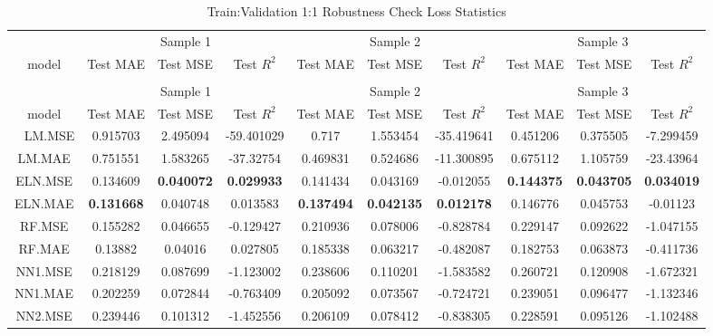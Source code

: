 \begingroup\fontsize{6}{8}\selectfont

\begin{longtable}[t]{cccccccccc}
\caption{\label{tab:}Train:Validation 1:1 Robustness Check Loss Statistics}\\
\toprule
\multicolumn{1}{c}{ } & \multicolumn{3}{c}{Sample 1} & \multicolumn{3}{c}{Sample 2} & \multicolumn{3}{c}{Sample 3} \\
\cmidrule(l{3pt}r{3pt}){2-4} \cmidrule(l{3pt}r{3pt}){5-7} \cmidrule(l{3pt}r{3pt}){8-10}
model & Test MAE & Test MSE & Test $R^2$ & Test MAE & Test MSE & Test $R^2$ & Test MAE & Test MSE & Test $R^2$\\
\midrule
\endfirsthead
\caption[]{Train:Validation 1:1 Robustness Check Loss Statistics }\\
\toprule
\multicolumn{1}{c}{ } & \multicolumn{3}{c}{Sample 1} & \multicolumn{3}{c}{Sample 2} & \multicolumn{3}{c}{Sample 3} \\
\cmidrule(l{3pt}r{3pt}){2-4} \cmidrule(l{3pt}r{3pt}){5-7} \cmidrule(l{3pt}r{3pt}){8-10}
model & Test MAE & Test MSE & Test $R^2$ & Test MAE & Test MSE & Test $R^2$ & Test MAE & Test MSE & Test $R^2$\\
\midrule
\endhead
\
\endfoot
\bottomrule
\endlastfoot
LM.MSE & 0.915703 & 2.495094 & -59.401029 & 0.717 & 1.553454 & -35.419641 & 0.451206 & 0.375505 & -7.299459\\
LM.MAE & 0.751551 & 1.583265 & -37.32754 & 0.469831 & 0.524686 & -11.300895 & 0.675112 & 1.105759 & -23.43964\\
ELN.MSE & 0.134609 & \textbf{0.040072} & \textbf{0.029933} & 0.141434 & 0.043169 & -0.012055 & \textbf{0.144375} & \textbf{0.043705} & \textbf{0.034019}\\
ELN.MAE & \textbf{0.131668} & 0.040748 & 0.013583 & \textbf{0.137494} & \textbf{0.042135} & \textbf{0.012178} & 0.146776 & 0.045753 & -0.01123\\
RF.MSE & 0.155282 & 0.046655 & -0.129427 & 0.210936 & 0.078006 & -0.828784 & 0.229147 & 0.092622 & -1.047155\\
\addlinespace
RF.MAE & 0.13882 & 0.04016 & 0.027805 & 0.185338 & 0.063217 & -0.482087 & 0.182753 & 0.063873 & -0.411736\\
NN1.MSE & 0.218129 & 0.087699 & -1.123002 & 0.238606 & 0.110201 & -1.583582 & 0.260721 & 0.120908 & -1.672321\\
NN1.MAE & 0.202259 & 0.072844 & -0.763409 & 0.205092 & 0.073567 & -0.724721 & 0.239051 & 0.096477 & -1.132346\\
NN2.MSE & 0.239446 & 0.101312 & -1.452556 & 0.206109 & 0.078412 & -0.838305 & 0.228591 & 0.095126 & -1.102488\\

\end{longtable}
